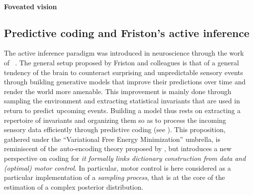 \documentclass{article}
\begin{document}



\paragraph{Foveated vision}



\subsection{Predictive coding and Friston's active inference}

The active inference paradigm was introduced in neuroscience through the work of ~\cite{friston2010free,friston2012perceptions}. %
The general setup proposed by Friston and colleagues is that of a general tendency of the brain to counteract surprising and unpredictable sensory events through building generative models that improve their predictions over time and render the world more amenable. This improvement is mainly done through sampling the environment and extracting statistical invariants that are used in return to predict upcoming events.
Building a model thus rests on extracting a repertoire of invariants and organizing them so as to process the incoming sensory data efficiently through predictive coding (see \cite{rao1999predictive}). This proposition, gathered under the ``Variational Free Energy Minimization'' umbrella, is reminiscent of the auto-encoding theory proposed by \cite{hinton1994autoencoders}, but introduces a new perspective on coding
for \emph{it formally links dictionary construction from data and (optimal) motor control}.
In particular, motor control is here considered as a particular implementation of a \emph{sampling process}, that is at the core of the estimation of a complex posterior distribution. 
\end{document}
